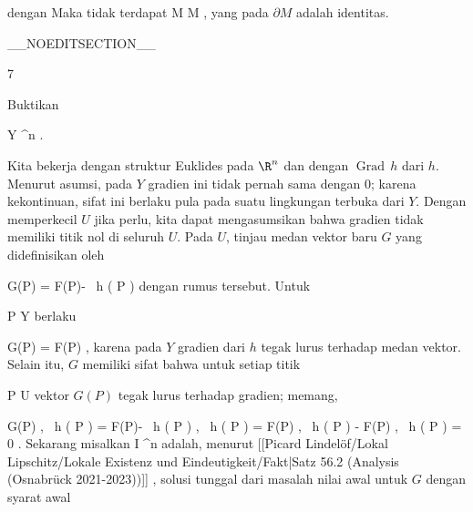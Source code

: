 {{ dengan
Maka tidak terdapat
\maabbdisp {\varphi} { M } { \partial M
} {,}
yang
pada $\partial M$ adalah identitas.}

 }

__NOEDITSECTION__

{7}

{

Buktikan
 {}

\mavergleichskette
{\vergleichskette
{ Y
}
{ \subseteq }{ \R^n
}
{  }{
}
{    }{
}
{   }{
}
}
{}{}{.}

}
{

Kita bekerja dengan struktur Euklides pada $\R^n$ dan dengan
$\operatorname{Grad} \,  h$ dari $h$. Menurut asumsi, pada $Y$ gradien ini tidak pernah sama dengan $0$; karena kekontinuan, sifat ini berlaku pula pada suatu lingkungan terbuka dari $Y$. Dengan memperkecil $U$ jika perlu, kita dapat mengasumsikan bahwa gradien tidak memiliki titik nol di seluruh $U$. Pada $U$, tinjau medan vektor baru $G$ yang didefinisikan oleh

\mavergleichskettedisp
{\vergleichskette
{ G(P)
}
{ =} { F(P)-  {  }
 \,  h  (  P )
}
{ } {
}
{ } {
}
{ } {
}
}
{}{}{}
dengan rumus tersebut. Untuk

\mavergleichskette
{\vergleichskette
{ P
}
{ \in }{ Y
}
{  }{
}
{    }{
}
{   }{
}
}
{}{}{}
berlaku

\mavergleichskette
{\vergleichskette
{ G(P)
}
{ = }{ F(P)
}
{  }{
}
{    }{
}
{   }{
}
}
{}{}{,}
karena pada $Y$ gradien dari $h$ tegak lurus terhadap medan vektor. Selain itu, $G$
 {} {}
memiliki sifat bahwa untuk setiap titik

\mavergleichskette
{\vergleichskette
{ P
}
{ \in }{ U
}
{  }{
}
{    }{
}
{   }{
}
}
{}{}{}
vektor $G(P)$ tegak lurus terhadap gradien; memang,

\mavergleichskettealignhandlinks
{\vergleichskettealignhandlinks
{ \left\langle  G(P) ,
 \,  h  (  P )   \right\rangle
}
{ =} { \left\langle  F(P)- {  }
 \,  h  (  P )  ,
 \,  h  (  P )   \right\rangle
}
{ =} { \left\langle  F(P) ,
 \,  h  (  P )   \right\rangle - \left\langle  F(P) ,
 \,  h  (  P )   \right\rangle
}
{ =} { 0
}
{ } {
}
}
{}
{}{.}
Sekarang misalkan
 { I} { \R^n
} {}
adalah, menurut
[[Picard Lindelöf/Lokal Lipschitz/Lokale Existenz und Eindeutigkeit/Fakt|Satz 56.2 (Analysis (Osnabrück 2021-2023))]]
, solusi tunggal dari masalah nilai awal untuk $G$ dengan syarat awal

}
